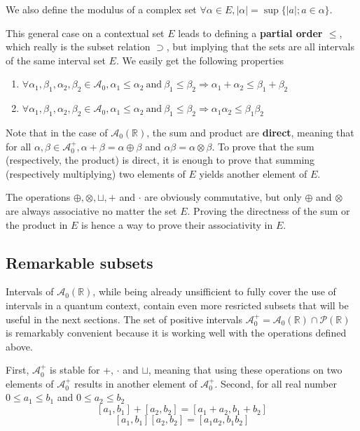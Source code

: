 We also define the modulus of a complex set $\forall \alpha \in E, |\alpha| = \sup\{|a| ; a \in \alpha\}$.

This general case on a contextual set $E$ leads to defining a \textbf{partial order $\le$}, which really is the subset relation $\supset$, but implying that the sets are all intervals of the same interval set $E$. We easily get the following properties
\begin{enumerate}[i]
    \item $\forall \alpha_1, \beta_1, \alpha_2, \beta_2 \in \mathcal{A}_0, \alpha_1 \le \alpha_2 ~\text{and}~ \beta_1 \le \beta_2 \Rightarrow \alpha_1 + \alpha_2 \le \beta_1 + \beta_2$
    \item $\forall \alpha_1, \beta_1, \alpha_2, \beta_2 \in \mathcal{A}_0, \alpha_1 \le \alpha_2 ~\text{and}~ \beta_1 \le \beta_2 \Rightarrow \alpha_1 \alpha_2 \le \beta_1 \beta_2$
\end{enumerate}

Note that in the case of $\mathcal{A}_0(\mathbb{R})$, the sum and product are \textbf{direct}, meaning that for all $\alpha, \beta \in \mathcal{A}_0^+, \alpha + \beta = \alpha \oplus \beta$ and $\alpha \beta = \alpha \otimes \beta$. To prove that the sum (respectively, the product) is direct, it is enough to prove that summing (respectively multiplying) two elements of $E$ yields another element of $E$.

The operations $\oplus, \otimes, \sqcup, +$ and $\cdot$ are obviously commutative, but only $\oplus$ and $\otimes$ are always associative no matter the set $E$. Proving the directness of the sum or the product in $E$ is hence a way to prove their associativity in $E$.

\subsection{Remarkable subsets}

Intervals of $\mathcal{A}_0(\mathbb{R})$, while being already unsifficient to fully cover the use of intervals in a quantum context, contain even more resricted subsets that will be useful in the next sections. The set of positive intervals $\mathcal{A}_0^+ = \mathcal{A}_0(\mathbb{R}) \cap \mathcal{P}(\mathbb{R})$ is remarkably convenient because it is working well with the operations defined above.

First, $\mathcal{A}_0^+$ is stable for +, $\cdot$ and $\sqcup$, meaning that using these operations on two elements of $\mathcal{A}_0^+$ results in another element of $\mathcal{A}_0^+$. Second, for all real number $0 \le a_1 \le b_1$ and $0 \le a_2 \le b_2$
$$[a_1, b_1] + [a_2, b_2] = [a_1 + a_2, b_1 + b_2]$$
$$[a_1, b_1] [a_2, b_2] = [a_1 a_2, b_1 b_2]$$

